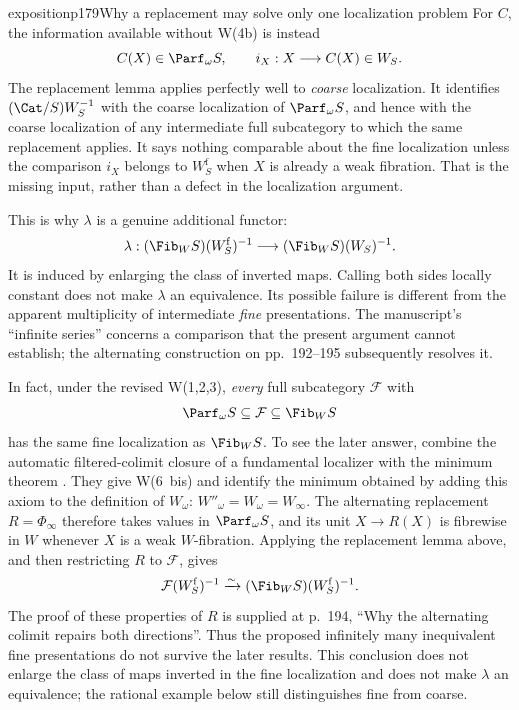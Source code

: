 \begin{dcomment}{exposition}{p179}{Why a replacement may solve only one localization problem}
For $C$, the information available without W(4b) is instead
\[
 C(X)\in\Parf_\omega S,\qquad i_X:X\longrightarrow C(X)\in W_S.
\]
The replacement lemma applies perfectly well to \emph{coarse} localization. It identifies $(\Cat/S)W_S^{-1}$ with the coarse localization of $\Parf_\omega S$, and hence with the coarse localization of any intermediate full subcategory to which the same replacement applies. It says nothing comparable about the fine localization unless the comparison $i_X$ belongs to $W_S^{\mathrm f}$ when $X$ is already a weak fibration. That is the missing input, rather than a defect in the localization argument.

This is why $\lambda$ is a genuine additional functor:
\[
 \lambda:(\Fib_W S)(W_S^{\mathrm f})^{-1}
 \longrightarrow(\Fib_W S)(W_S)^{-1}.
\]
It is induced by enlarging the class of inverted maps. Calling both sides locally constant does not make $\lambda$ an equivalence. Its possible failure is different from the apparent multiplicity of intermediate \emph{fine} presentations. The manuscript's ``infinite series'' concerns a comparison that the present argument cannot establish; the alternating construction on pp.~192--195 subsequently resolves it.

In fact, under the revised W(1,2,3), \emph{every} full subcategory $\mathcal F$ with
\[
 \Parf_\omega S\subseteq\mathcal F\subseteq\Fib_W S
\]
has the same fine localization as $\Fib_W S$. To see the later answer, combine the automatic filtered-colimit closure of a fundamental localizer with the minimum theorem \citep[Corollary~4.2.22 and Theorem~6.1.18]{Cisinski2006}. They give W(6~bis) and identify the minimum obtained by adding this axiom to the definition of $W_\omega$: $W''_\omega=W_\omega=W_\infty$. The alternating replacement $R=\Phi_\infty$ therefore takes values in $\Parf_\omega S$, and its unit $X\to R(X)$ is fibrewise in $W$ whenever $X$ is a weak $W$-fibration. Applying the replacement lemma above, and then restricting $R$ to $\mathcal F$, gives
\[
 \mathcal F(W_S^{\mathrm f})^{-1}
 \xrightarrow{\sim}(\Fib_W S)(W_S^{\mathrm f})^{-1}.
\]
The proof of these properties of $R$ is supplied at p.~194, ``Why the alternating colimit repairs both directions''. Thus the proposed infinitely many inequivalent fine presentations do not survive the later results. This conclusion does not enlarge the class of maps inverted in the fine localization and does not make $\lambda$ an equivalence; the rational example below still distinguishes fine from coarse.


\end{dcomment}
